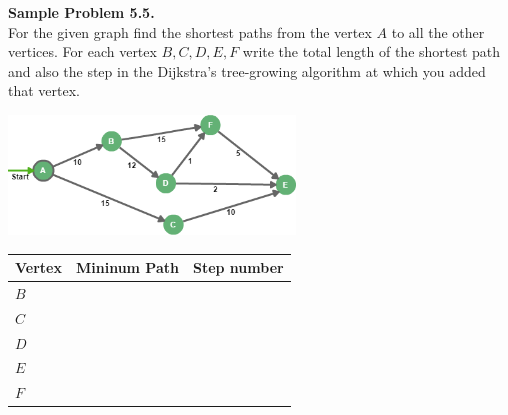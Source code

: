 \documentclass[jou]{apa6}
\begin{document}
\vspace{6pt}
{\bf Sample Problem 5.5.}\\ For the given graph find the shortest paths from the vertex $A$ 
to all the other vertices. For each vertex $B,C,D,E,F$ write the total length of the 
shortest path and also the step in the Dijkstra's tree-growing algorithm at which you added that vertex. 

\begin{center}
\includegraphics[width=3in]{final-exams/dijkstra-graph.png}
\end{center}

\begin{tabular}{|l|c|c|} \hline
Vertex & Mininum Path & Step number \\ \hline
$B$ & & \\ \hline
$C$ & & \\ \hline
$D$ & & \\ \hline
$E$ & & \\ \hline
$F$ & & \\ \hline
\end{tabular}
\end{document}
